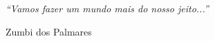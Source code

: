 \documentclass[a4paper, 11pt, oneside]{Relatorio_sem_2}  %
\begin{document}
 
 
 
 
 
 
 

\pagestyle{empty}  %

\null\vfill
\textit{``Vamos fazer um mundo mais do nosso jeito...''}

\begin{flushright}
Zumbi dos Palmares
\end{flushright}

\vfill\vfill\vfill\vfill\vfill\vfill\null
\clearpage  %
\end{document}
